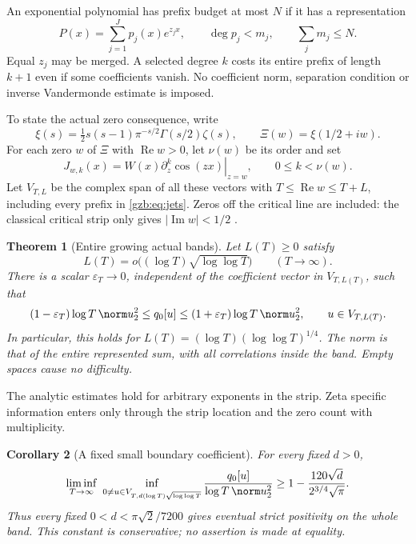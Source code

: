 \documentclass[11pt,a4paper]{article}
\numberwithin{equation}{section}
\newtheorem{theorem}{Theorem}[section]
\newtheorem{corollary}[theorem]{Corollary}
\theoremstyle{definition}\newtheorem{definition}[theorem]{Definition}
\theoremstyle{remark}\newtheorem{remark}[theorem]{Remark}
\DeclareMathOperator{\Rea}{Re}\DeclareMathOperator{\Ima}{Im}
\begin{document}
An exponential polynomial has prefix budget at most $N$ if it has a
representation
\begin{equation}\label{gzb:eq:prefix}
 P(x)=\sum_{j=1}^{J}p_j(x)e^{z_jx},\qquad
 \deg p_j<m_j,\qquad \sum_jm_j\le N.
\end{equation}
Equal $z_j$ may be merged. A selected degree $k$ costs its entire prefix
of length $k+1$ even if some coefficients vanish. No coefficient norm,
separation condition or inverse Vandermonde estimate is imposed.

To state the actual zero consequence, write
\[
 \xi(s)=\tfrac12s(s-1)\pi^{-s/2}\Gamma(s/2)\zeta(s),\qquad
 \Xi(w)=\xi(1/2+iw).
\]
For each zero $w$ of $\Xi$ with $\Rea w>0$, let $\nu(w)$ be its order and set
\begin{equation}\label{gzb:eq:jets}
 J_{w,k}(x)=W(x)\left.\partial_z^k\cos(zx)\right|_{z=w},
 \qquad 0\le k<\nu(w).
\end{equation}
Let $V_{T,L}$ be the complex span of all these vectors with
$T\le\Rea w\le T+L$, including every prefix in \eqref{gzb:eq:jets}.
Zeros off the critical line are included: the classical critical strip
only gives $|\Ima w|<1/2$ \cite[Sections 25.4 and 25.10]{DLMF}.

\begin{theorem}[Entire growing actual bands]\label{gzb:thm:main}
Let $L(T)\ge0$ satisfy
\begin{equation}\label{gzb:eq:width}
 L(T)=o\bigl((\log T)\sqrt{\log\log T}\bigr)
 \qquad (T\longrightarrow\infty).
\end{equation}
There is a scalar $\varepsilon_T\to0$, independent of the coefficient
vector in $V_{T,L(T)}$, such that
\begin{equation}\label{gzb:eq:main}
 (1-\varepsilon_T)\log T\,\norm u_2^2
 \le q_0[u]\le
 (1+\varepsilon_T)\log T\,\norm u_2^2,\qquad u\in V_{T,L(T)}.
\end{equation}
In particular, this holds for $L(T)=(\log T)(\log\log T)^{1/4}$.
The norm is that of the entire represented sum, with all correlations
inside the band. Empty spaces cause no difficulty.
\end{theorem}

The analytic estimates hold for arbitrary exponents in the strip.
Zeta specific information enters only through the strip location and
the zero count with multiplicity.
\begin{corollary}[A fixed small boundary coefficient]\label{gzb:cor:boundary}
For every fixed $d>0$,
\begin{equation}\label{gzb:eq:boundary}
 \liminf_{T\to\infty}\ \inf_{0\ne u\in
 V_{T,d(\log T)\sqrt{\log\log T}}}
 \frac{q_0[u]}{\log T\,\norm u_2^2}
 \ge 1-\frac{120\sqrt d}{2^{3/4}\sqrt\pi}.
\end{equation}
Thus every fixed $0<d<\pi\sqrt2/7200$ gives eventual strict positivity
on the whole band. This constant is conservative; no assertion is made
at equality.
\end{corollary}
\end{document}
